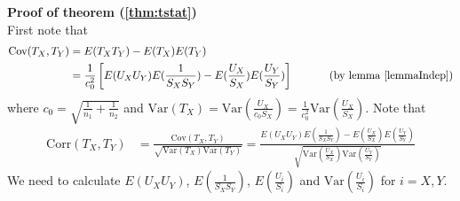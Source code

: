 \documentclass[12pt, a4paper]{article}
\newcommand{\cov}{\text{Cov}}
\newcommand{\cor}{\text{Corr}}
\newcommand{\var}{\text{Var}}
\begin{document}
	\textbf{Proof of theorem (\ref{thm:tstat})} \\
	First note that
	\begin{align*}
		\cov(T_X, T_Y) &= E(T_XT_Y) - E(T_X)E(T_Y) \\
		& = \frac{1}{c_0^2} \left[E(U_XU_Y)E(\frac{1}{S_XS_Y}) - E(\frac{U_X}{S_X})E( \frac{U_Y}{S_Y})\right]   
		~~~~~~~~~\text{ (by lemma \ref{lemmaIndep})}
	\end{align*}
	where $c_0 = \sqrt{\frac{1}{n_1} + \frac{1}{n_2}}$ and $\var(T_X) = \var(\frac{U_X}{c_0S_X})=
	\frac{1}{c_0^2}\var(\frac{U_X}{S_X})$. 
	Note that 
	\begin{align}\label{eq:Tcorrelation}
		\cor(T_X, T_Y) & = \frac{\cov(T_X, T_Y) }{\sqrt{\var(T_X) \var(T_Y) }} =
		\frac{E(U_XU_Y)E(\frac{1}{S_XS_Y}) - E(\frac{U_X}{S_X})E(
			\frac{U_Y}{S_Y})}{\sqrt{\var(\frac{U_X}{S_X})\var(\frac{U_Y}{S_Y})}} 
	\end{align}
	We need to calculate $E(U_XU_Y)$, $E(\frac{1}{S_XS_Y})$, $ E(\frac{U_i}{S_i})$ and
	$\var(\frac{U_i}{S_i})$ for $i =X, Y$. 
\end{document}
